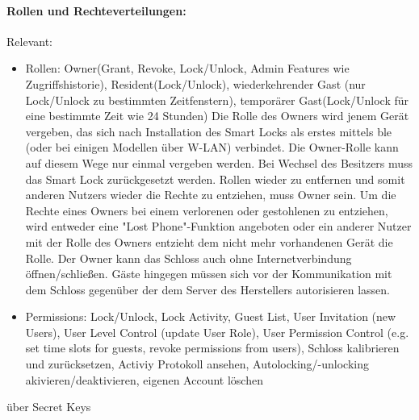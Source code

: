         \paragraph{Rollen und Rechteverteilungen:}
        Relevant: \cite{Ye2017}\cite{Ho2016}
		\begin{itemize}
			\item Rollen: Owner(Grant, Revoke, Lock/Unlock, Admin Features wie Zugriffshistorie), Resident(Lock/Unlock), wiederkehrender Gast (nur Lock/Unlock zu bestimmten Zeitfenstern), temporärer Gast(Lock/Unlock für eine bestimmte Zeit wie 24 Stunden)
			    Die Rolle des Owners wird jenem Gerät vergeben, das sich nach Installation des Smart Locks als erstes mittels \gls{ble} (oder bei einigen Modellen über W-LAN) verbindet.
			    Die Owner-Rolle kann auf diesem Wege nur einmal vergeben werden.
			    Bei Wechsel des Besitzers muss das Smart Lock zurückgesetzt werden.
			    Rollen wieder zu entfernen und somit anderen Nutzers wieder die Rechte zu entziehen, muss Owner sein.
			    Um die Rechte eines Owners bei einem verlorenen oder gestohlenen zu entziehen, wird entweder eine "Lost Phone"-Funktion angeboten oder ein anderer Nutzer mit der Rolle des Owners entzieht dem nicht mehr vorhandenen Gerät die Rolle.
			    Der Owner kann das Schloss auch ohne Internetverbindung öffnen/schließen.
			    Gäste hingegen müssen sich vor der Kommunikation mit dem Schloss gegenüber der dem Server des Herstellers autorisieren lassen.
			\item Permissions: Lock/Unlock, Lock Activity, Guest List, User Invitation (new Users), User Level Control (update User Role), User Permission Control (e.g. set time slots for guests, revoke permissions from users), Schloss kalibrieren und zurücksetzen\cite{Fuller2017}, Activiy Protokoll ansehen\cite{Fuller2017}, Autolocking/-unlocking akivieren/deaktivieren, eigenen Account löschen
		\end{itemize}
		über Secret Keys\cite{Fuller2017}
